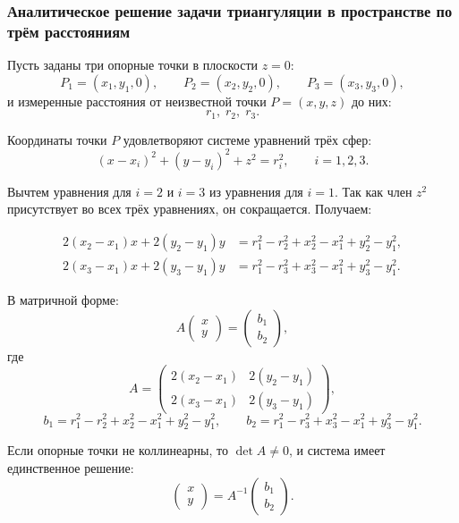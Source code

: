 \documentclass[a4paper,12pt]{article} %
\newcounter{subsubsubsection}[subsubsection]
\begin{document}
\subsubsection{Аналитическое решение задачи триангуляции в пространстве по трём расстояниям}

Пусть заданы три опорные точки в плоскости \(z=0\):
\[
P_1 = (x_1, y_1, 0), \qquad
P_2 = (x_2, y_2, 0), \qquad
P_3 = (x_3, y_3, 0),
\]
и измеренные расстояния от неизвестной точки \(P=(x,y,z)\) до них:
\[
r_1,\; r_2,\; r_3.
\]


Координаты точки \(P\) удовлетворяют системе уравнений трёх сфер:
\[
(x - x_i)^2 + (y - y_i)^2 + z^2 = r_i^2, \qquad i = 1,2,3.
\]


Вычтем уравнения для \(i=2\) и \(i=3\) из уравнения для \(i=1\).  
Так как член \(z^2\) присутствует во всех трёх уравнениях, он сокращается. Получаем:

\begin{align}
2(x_2-x_1)x + 2(y_2-y_1)y &= r_1^2 - r_2^2 + x_2^2 - x_1^2 + y_2^2 - y_1^2, \\
2(x_3-x_1)x + 2(y_3-y_1)y &= r_1^2 - r_3^2 + x_3^2 - x_1^2 + y_3^2 - y_1^2.
\end{align}

В матричной форме:
\[
A
\begin{pmatrix} x \\ y \end{pmatrix}
=
\begin{pmatrix} b_1 \\ b_2 \end{pmatrix},
\]
где
\[
A =
\begin{pmatrix}
2(x_2-x_1) & 2(y_2-y_1) \\
2(x_3-x_1) & 2(y_3-y_1)
\end{pmatrix},
\]
\[
b_1 = r_1^2 - r_2^2 + x_2^2 - x_1^2 + y_2^2 - y_1^2,
\qquad
b_2 = r_1^2 - r_3^2 + x_3^2 - x_1^2 + y_3^2 - y_1^2.
\]

Если опорные точки не коллинеарны, то \(\det A \neq 0\), и система имеет единственное решение:
\[
\begin{pmatrix} x \\ y \end{pmatrix} = A^{-1} \begin{pmatrix} b_1 \\ b_2 \end{pmatrix}.
\]
\end{document}
